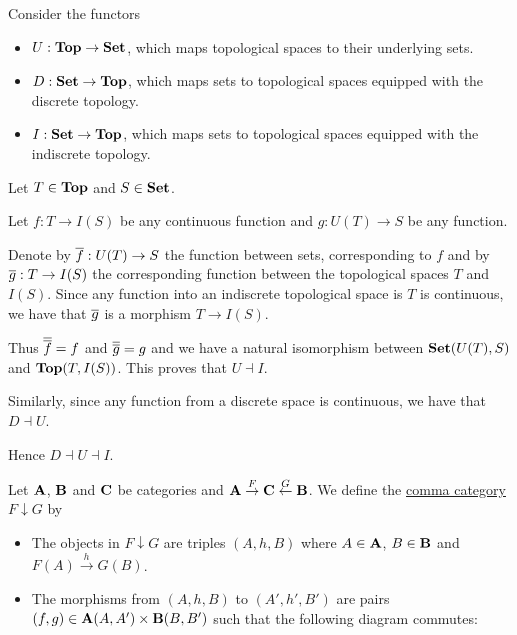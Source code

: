 \begin{example}\label{ex:top_adjoint_functor}\cite[example 2.1.5]{Leinster2014}
  Consider the functors
  \begin{itemize}
    \item $U: \operatorname{\mathbf{Top}} \to \operatorname{\mathbf{Set}}$, which maps topological spaces to their underlying sets.
    \item $D: \operatorname{\mathbf{Set}} \to \operatorname{\mathbf{Top}}$, which maps sets to topological spaces equipped with the discrete topology.
    \item $I: \operatorname{\mathbf{Set}} \to \operatorname{\mathbf{Top}}$, which maps sets to topological spaces equipped with the indiscrete topology.
  \end{itemize}

  Let $T \in \operatorname{\mathbf{Top}}$ and $S \in \operatorname{\mathbf{Set}}$.

  Let $f: T \to I(S)$ be any continuous function and $g: U(T) \to S$ be any function.

  Denote by $\overline{f}: U(T) \to S$ the function between sets, corresponding to $f$ and by $\overline{g}: T \to I(S)$ the corresponding function between the topological spaces $T$ and $I(S)$. Since any function into an indiscrete topological space is $T$ is continuous, we have that $\overline{g}$ is a morphism $T \to I(S)$.

  Thus $\overline{\overline{f}} = f$ and $\overline{\overline{g}} = g$ and we have a natural isomorphism between $\operatorname{\mathbf{Set}}(U(T), S)$ and $\operatorname{\mathbf{Top}}(T, I(S))$. This proves that $U \dashv I$.

  Similarly, since any function from a discrete space is continuous, we have that $D \dashv U$.

  Hence $D \dashv U \dashv I$.
\end{example}

\begin{definition}\label{def:comma_category}\cite[definition 2.3.1]{Leinster2014}
  Let $\operatorname{\mathbf{A}}$, $\operatorname{\mathbf{B}}$ and $\operatorname{\mathbf{C}}$ be categories and $\operatorname{\mathbf{A}} \overset F \to \operatorname{\mathbf{C}} \overset G \leftarrow \operatorname{\mathbf{B}}$. We define the \uline{comma category} $F \downarrow G$ by
  \begin{itemize}
    \item The objects in $F \downarrow G$ are triples $(A, h, B)$ where $A \in \operatorname{\mathbf{A}}$, $B \in \operatorname{\mathbf{B}}$ and $F(A) \overset h \to G(B)$.
    \item The morphisms from $(A, h, B)$ to $(A', h', B')$ are pairs $(f, g) \in \operatorname{\mathbf{A}}(A, A') \times \operatorname{\mathbf{B}}(B, B')$ such that the following diagram commutes:
    \begin{center}
    \end{center}
  \end{itemize}
\end{definition}

